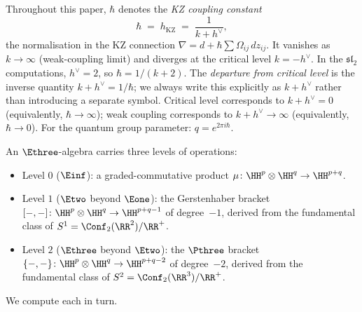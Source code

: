 \begin{remark}
\label{rem:hbar-convention}
Throughout this paper, $\hbar$ denotes the
\emph{KZ coupling constant}
\begin{equation}\label{eq:hbar-convention}
 \hbar \;=\; h_{\mathrm{KZ}}
 \;=\; \frac{1}{k + h^\vee},
\end{equation}
the normalisation in the KZ connection
$\nabla = d + \hbar \sum \Omega_{ij}\,dz_{ij}$.
It vanishes as $k \to \infty$ (weak-coupling limit) and
diverges at the critical level $k = -h^\vee$.
In the $\mathfrak{sl}_2$ computations, $h^\vee = 2$,
so $\hbar = 1/(k+2)$.
The \emph{departure from critical level} is the inverse
quantity $k + h^\vee = 1/\hbar$; we always write this
explicitly as $k + h^\vee$ rather than introducing a
separate symbol. Critical level corresponds to
$k + h^\vee = 0$ (equivalently, $\hbar \to \infty$);
weak coupling corresponds to $k + h^\vee \to \infty$
(equivalently, $\hbar \to 0$).
For the quantum group parameter: $q = e^{2\pi i \hbar}$.
\end{remark}

An $\Ethree$-algebra carries three levels of
operations:
\begin{itemize}
\item Level $0$ ($\Einf$): a graded-commutative product
 $\mu\colon \HH^p \otimes \HH^q \to \HH^{p+q}$.
\item Level $1$ ($\Etwo$ beyond $\Eone$): the
 Gerstenhaber bracket
 $[-,-]\colon \HH^p \otimes \HH^q \to \HH^{p+q-1}$
 of degree~$-1$, derived from the fundamental class of
 $S^1 = \Conf_2(\RR^2)/\RR^+$.
\item Level $2$ ($\Ethree$ beyond $\Etwo$): the $\Pthree$
 bracket
 $\{-,-\}\colon \HH^p \otimes \HH^q \to \HH^{p+q-2}$
 of degree~$-2$, derived from the fundamental class of
 $S^2 = \Conf_2(\RR^3)/\RR^+$.
\end{itemize}
We compute each in turn.

